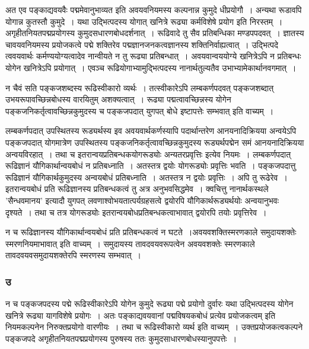 				\begin{small}
				
					अत एव पङ्काद्यवयवैः पद्ममेवानुभाव्यत इति अवयवनियमस्य कल्पनान्न कुमुदे धीप्रयोगौ~। अन्यथा रूडावपि योगान्न कुतस्तौ कुमुदे~। यथा उद्भित्पदस्य योगात् खनित्रे रूढ्या कर्मविशेषे प्रयोग इति निरस्तम्~। अगृहीतनियतपद्मप्रयोगस्य कुमुदसधारणबोधदर्शनात्~। रूढिवादे तु सैव प्रतिबन्धिका मण्डपपदवत्~। ज्ञातस्य चावयवनियमस्य प्रयोजकत्वे पद्मे शक्तिरेव पद्मज्ञानजनकत्वज्ञानस्य शक्तिनिर्वाह्यत्वात्~। उद्भित्पदे त्ववयवार्थः कर्मण्ययोग्यत्वादेव नान्वीयते न तु रूढ्या प्रतिबन्धात्~। अवयवान्वययोग्ये  खनित्रेऽपि न प्रतिबन्धः योगेन खनित्रेऽपि प्रयोगात्~। एवञ्च रूढियोगाभ्यामुद्भित्पदस्य नानार्थतुल्यतैव  उभाभ्यामेकार्थानवगमात्~। 
				\end{small}
				
				न चैवं सति पङ्कजशब्दस्य रूढिस्वीकारो व्यर्थः~। तत्स्वीकारेऽपि लम्बकर्णपदवत्  पङ्कजशब्दात् उभयरूपावच्छिन्नबोधस्य वारयितुम् अशक्यत्वात्~। रूढ्या पद्मत्वावच्छिन्नस्य योगेन पङ्कजनिकर्तृत्वावच्छिन्नकुमुदस्य च पङ्कजपदात्  युगपत् बोधे इष्टापत्तेः सम्भवात् इति वाच्यम्~।
 
				लम्बकर्णपदात् उपस्थितस्य रूड्यर्थस्य इव अवयवार्थकर्णस्यापि पदार्थान्तरेण आनयनादिक्रियया  अन्वयेऽपि  पङ्कजपदात् योगमात्रेण उपस्थितस्य पङ्कजनिकर्तृत्वावच्छिन्नकुमुदस्य रूड्यर्थपद्मेन समं आनयनादिक्रियया  अन्वयविरहात्~। तथा च इतरान्वयप्रतिबन्धकयोगरूड्योः अन्यतरप्रवृत्तिः इत्येव नियमः~। लम्बकर्णपदात् रूढिज्ञानं यौगिकार्थान्वयबोधं न प्रतिबध्नाति~। अतस्तत्र द्वयोः योगरूड्योः प्रवृत्तिः भवति~। पङ्कजपदात्तु  रूढिज्ञानं  यौगिकार्थकुमुदस्य अन्वयबोधं प्रतिबध्नाति~। अतस्तत्र न द्वयोः प्रवृत्तिः~। अपि तु रूढेरेव~। इतरान्वयबोधं प्रति रूढिज्ञानस्य प्रतिबन्धकत्वं तु अत्र अनुभवसिद्धमेव~। क्वचित्तु नानार्थकस्थले  ’सैन्धवमानय’ इत्यादौ युगपत् लवणाश्वोभयतात्पर्यग्रहसत्वे द्वयोरपि यौगिकार्थरूड्यर्थयोः अन्वयानुभवः दृश्यते~। तथा च तत्र योगरूड्योः इतरान्वयबोधप्रतिबन्धकत्वाभावात् द्वयोरपि तयोः प्रवृत्तिरेव~।

				न च रूढिज्ञानस्य यौगिकार्थान्वयबोधं प्रति प्रतिबन्धकत्वं न घटते~।अवयवशक्तिस्मरणकाले समुदायशक्तेः स्मरणनियमाभावात् इति वाच्यम्~। समुदायस्य तावदवयवरूपत्वेन अवयवशक्तेः स्मरणकाले  तावदवयवसमुदायशक्तेरपि स्मरणस्य सम्भवात्~।

			\subsubsection{उ}
			
				न च पङ्कजपदस्य पद्मे रूढिस्वीकारेऽपि योगेन कुमुदे रूढ्या पद्मे प्रयोगो दुर्वारः यथा उद्भित्पदस्य योगेन खनित्रे रूढ्या यागविशेषे  प्रयोगः~। अतः पङ्काद्यवयवानां पद्मविषयकबोधं प्रत्येव  प्रयोजकत्वम् इति नियमकल्पनेन निरुक्तप्रयोगो वारणीयः~। तथा च रूढिस्वीकारो व्यर्थ इति वाच्यम्~। उक्तप्रयोजकत्वकल्पने पङ्कजपदे अगृहीतनियतपद्मप्रयोगस्य  पुरुषस्य ततः कुमुदसाधारणबोधस्यानुपपत्तेः~।

